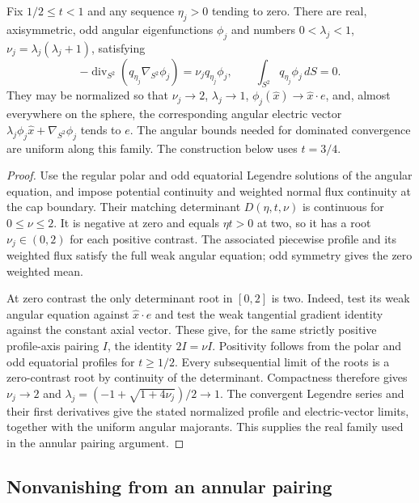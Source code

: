 \begin{lemma}
\label{hs:modal-angular-branch}
Fix $1/2\leq t<1$ and any sequence $\eta_j>0$ tending to zero.
There are real, axisymmetric, odd angular eigenfunctions $\phi_j$
and numbers $0<\lambda_j<1$, $\nu_j=\lambda_j(\lambda_j+1)$,
satisfying
\begin{equation}
 -\operatorname{div}_{S^2}(q_{\eta_j}\nabla_{S^2}\phi_j)
       =\nu_j q_{\eta_j}\phi_j,
 \qquad \int_{S^2}q_{\eta_j}\phi_j\,dS=0.
 \label{hs:modal-angular-branch-equation}
\end{equation}
They may be normalized so that $\nu_j\to2$, $\lambda_j\to1$,
$\phi_j(\widehat x)\to\widehat x\cdot e$, and, almost everywhere on
the sphere, the corresponding
angular electric vector
$\lambda_j\phi_j\widehat x+\nabla_{S^2}\phi_j$ tends to $e$.
The angular bounds needed for dominated convergence are uniform
along this family.  The construction below uses $t=3/4$.
\end{lemma}

\begin{proof}
Use the regular polar and odd equatorial Legendre solutions of the
angular equation, and impose potential continuity and weighted normal
flux continuity at the cap boundary.  Their matching determinant
$D(\eta,t,\nu)$ is continuous for $0\leq\nu\leq2$.
It is negative at zero and equals $\eta t>0$ at two, so it has
a root $\nu_j\in(0,2)$ for each positive contrast.  The associated
piecewise profile and its weighted flux satisfy the full weak angular
equation; odd symmetry gives the zero weighted mean.

At zero contrast the only determinant root in $[0,2]$ is two.
Indeed, test its weak angular equation against $\widehat x\cdot e$
and test the weak tangential gradient identity against the constant
axial vector.  These give, for the same strictly positive profile-axis
pairing $I$, the identity $2I=\nu I$.  Positivity follows from the
polar and odd equatorial profiles for $t\geq1/2$.
Every subsequential limit of the roots is a zero-contrast root by
continuity of the determinant.  Compactness therefore gives
$\nu_j\to2$ and $\lambda_j=(-1+\sqrt{1+4\nu_j})/2\to1$.
The convergent Legendre series and their first derivatives give
the stated normalized profile and electric-vector limits, together
with the uniform angular majorants.  This supplies the real family
used in the annular pairing argument.
\end{proof}

\subsection{Nonvanishing from an annular pairing}

